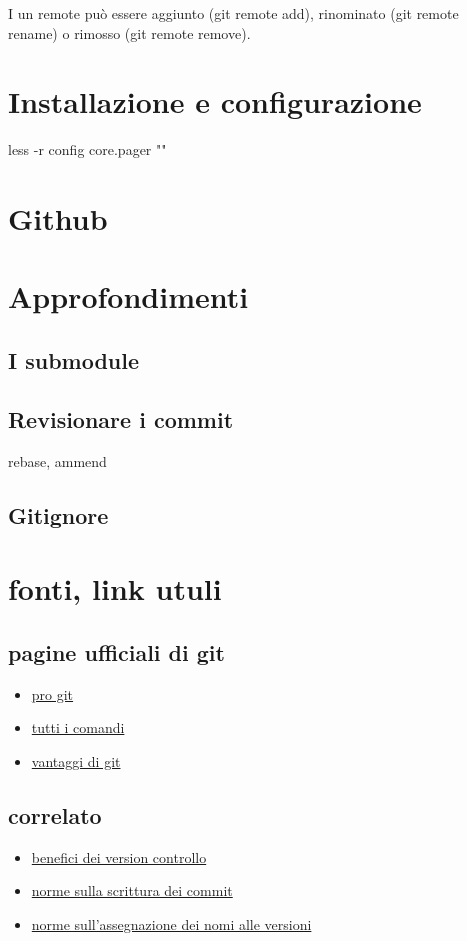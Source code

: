 \documentclass{article} \usepackage[textwidth=18cm,textheight=18cm]{geometry}
\begin{document}
I un remote può essere aggiunto (git remote add), rinominato (git remote rename)
o rimosso (git remote remove).

\section{Installazione e configurazione\label{configurazione}}

less -r 
config core.pager ""

\section{Github}

\section{Approfondimenti}

\subsection{I submodule}

\subsection{Revisionare i commit}

rebase, ammend

\subsection{Gitignore}

\section{fonti, link utuli}

\subsection{pagine ufficiali di git}
\begin{itemize}
    \item \href{https://git-scm.com/book/en/v2}{pro git}
    \item \href{https://git-scm.com/doc}{tutti i comandi}
    \item \href{https://git-scm.com/about/branching-and-merging}{vantaggi di git}
\end{itemize}

\subsection{correlato}
\begin{itemize}
    \item \href{https://www.atlassian.com/git/tutorials/what-is-version-control}{benefici dei version controllo}
    \item \href{https://chris.beams.io/posts/git-commit/}{norme sulla scrittura dei commit}
    \item \href{https://semver.org/}{norme sull'assegnazione dei nomi alle versioni}
\end{itemize}
\end{document}
